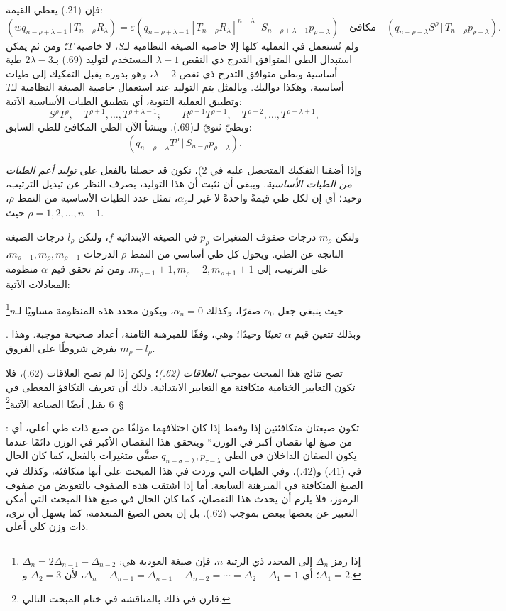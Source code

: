 \documentclass[11pt]{article}
\providecommand{\glqq}{\textquotedblbase}
\providecommand{\grqq}{\textquotedblleft}
\providecommand{\srcnumdisplay}[3][3.4em]{%
  \par\smallskip\noindent
  \babelsublr{\begin{minipage}[t]{#1}\vspace*{0pt}\srcLTR{#2}\end{minipage}%
  \begin{minipage}[t]{\dimexpr\linewidth-#1\relax}\vspace*{0pt}\centering
  \(\displaystyle #3\)\end{minipage}}\par\smallskip}
\newcommand{\srcLTR}[1]{\relax\ifmmode\text{\mbox{\babelsublr{\foreignlanguage{english}{#1}}}}\else\babelsublr{\foreignlanguage{english}{#1}}\fi}
\newcommand{\srcfn}[2]{\begingroup\renewcommand{\thefootnote}{\srcLTR{#1}}\footnote{#2}\addtocounter{footnote}{-1}\endgroup}
\providecommand{\pair}[2]{(#1\,|\,#2)}
\providecommand{\eps}{\varepsilon}
\begin{document}
فإن (21.) يعطي القيمة:
\[
 \pair{wq_{n-\rho+\lambda-1}}{T_{n-\rho}R_\lambda}
 =\eps\pair{q_{n-\rho+\lambda-1}[T_{n-\rho}R_\lambda]^{n-\lambda}}{S_{n-\rho+\lambda-1}p_{\rho-\lambda}}
 \quad\text{مكافئ}\quad
 \pair{q_{n-\rho-\lambda}S^\rho}{T_{n-\rho}p_{\rho-\lambda}}.
\]
ولم تُستعمل في العملية كلها إلا خاصية الصيغة النظامية لـ$S$، لا خاصية $T$؛ ومن ثم يمكن استبدال الطي المتوافق التدرج ذي النقص $\lambda-1$ المستخدم لتوليد (69.) بـ$2\lambda-3$ طية أساسية وبطي متوافق التدرج ذي نقص $\lambda-2$، وهو بدوره يقبل التفكيك إلى طيات أساسية، وهكذا دواليك. وبالمثل يتم التوليد عند استعمال خاصية الصيغة النظامية لـ$T$ وتطبيق العملية الثنوية، أي بتطبيق الطيات الأساسية الآتية:
\[
 S^\rho T^\rho,\quad T^{\rho+1},\ldots,T^{\rho+\lambda-1};
 \qquad R^{\rho-1}T^{\rho-1},\quad T^{\rho-2},\ldots,T^{\rho-\lambda+1},
\]
وبطيّ ثنويّ لـ(69.). وينشأ الآن الطي المكافئ للطي السابق:
\[
 \pair{q_{n-\rho-\lambda}T^\rho}{S_{n-\rho}p_{\rho-\lambda}}.
\]

وإذا أضفنا التفكيك المتحصل عليه في 2)، نكون قد حصلنا بالفعل على \emph{توليد أعم الطيات من الطيات الأساسية}. ويبقى أن نثبت أن هذا التوليد، بصرف النظر عن تبديل الترتيب، \emph{وحيد}؛ أي إن لكل طي قيمةً واحدةً لا غير لـ$\alpha_\rho$، تمثل عدد الطيات الأساسية من النمط $\rho$، حيث $\rho=1,2,\ldots,n-1$.

ولتكن $m_\rho$ درجات صفوف المتغيرات $p_\rho$ في الصيغة الابتدائية $f$، ولتكن $l_\rho$ درجات الصيغة الناتجة عن الطي. ويحول كل طي أساسي من النمط $\rho$ الدرجات $m_{\rho-1},m_\rho,m_{\rho+1}$، على الترتيب، إلى $m_{\rho-1}+1,m_\rho-2,m_{\rho+1}+1$. ومن ثم تحقق قيم $\alpha$ منظومة المعادلات الآتية:
\srcnumdisplay[4.2em]{(70.)}{%
 m_\rho-l_\rho=-\alpha_{\rho-1}+2\alpha_\rho-\alpha_{\rho+1},
 \qquad (\rho=1,2,\ldots,n-1)}
حيث ينبغي جعل $\alpha_0$ صفرًا، وكذلك $\alpha_n=0$، ويكون محدد هذه المنظومة مساويًا لـ$n$\srcfn{*)}{إذا رمز $\Delta_n$ إلى المحدد ذي الرتبة $n$، فإن صيغة العودية هي: $\Delta_n=2\Delta_{n-1}-\Delta_{n-2}$؛ أي $\Delta_n-\Delta_{n-1}=\Delta_{n-1}-\Delta_{n-2}=\cdots=\Delta_2-\Delta_1=1$، لأن $\Delta_2=3$ و$\Delta_1=2$.}. وبذلك تتعين قيم $\alpha$ تعينًا وحيدًا؛ وهي، وفقًا للمبرهنة الثامنة، أعداد صحيحة موجبة. وهذا يفرض شروطًا على الفروق $m_\rho-l_\rho$.

تصح نتائج هذا المبحث \emph{بموجب العلاقات (62.)}؛ ولكن إذا لم تصح العلاقات (62.)، فلا تكون التعابير الختامية متكافئة مع التعابير الابتدائية. ذلك أن تعريف التكافؤ المعطى في \S\ 6 يقبل أيضًا الصياغة الآتية\srcfn{**)}{قارن في ذلك بالمناقشة في ختام المبحث التالي.}: \glqq{}تكون صيغتان متكافئتين إذا وفقط إذا كان اختلافهما مؤلفًا من صيغ ذات طي أعلى، أي من صيغ لها نقصان أكبر في الوزن.\grqq{} ويتحقق هذا النقصان الأكبر في الوزن دائمًا عندما يكون الصفان الداخلان في الطي $q_{n-\sigma-\lambda},p_{\tau-\lambda}$ صفَّي متغيرات بالفعل، كما كان الحال في (41.) و(42.)، وفي الطيات التي وردت في هذا المبحث على أنها متكافئة، وكذلك في الصيغ المتكافئة في المبرهنة السابعة. أما إذا اشتقت هذه الصفوف بالتعويض من صفوف الرموز، فلا يلزم أن يحدث هذا النقصان، كما كان الحال في صيغ هذا المبحث التي أمكن التعبير عن بعضها ببعض بموجب (62.). بل إن بعض الصيغ المنعدمة، كما يسهل أن نرى، ذات وزن كلي أعلى.
\end{document}
